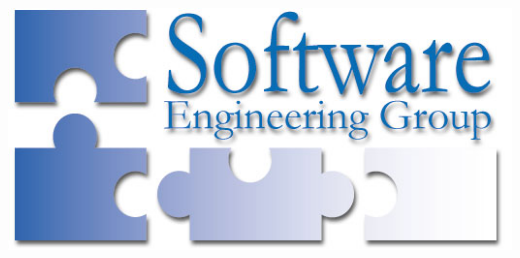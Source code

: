 \begin{titlepage}
\begin{center}
\begin{minipage}[c]{0.3\textwidth}
            \includegraphics[scale=0.25]{logos/softeng.png}   
        \end{minipage}

             
    \end{center}
 \end{titlepage}